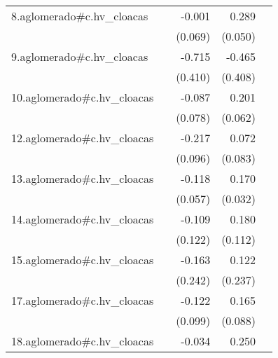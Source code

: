 {\begin{longtable}{l*{4}{D{.}{.}{-1}}}
\addlinespace
8.aglomerado#c.hv\_cloacas&                     &      -0.001         &       0.289\sym{***}&                     \\
            &                     &     (0.069)         &     (0.050)         &                     \\
\addlinespace
9.aglomerado#c.hv\_cloacas&                     &      -0.715         &      -0.465         &                     \\
            &                     &     (0.410)         &     (0.408)         &                     \\
\addlinespace
10.aglomerado#c.hv\_cloacas&                     &      -0.087         &       0.201\sym{**} &                     \\
            &                     &     (0.078)         &     (0.062)         &                     \\
\addlinespace
12.aglomerado#c.hv\_cloacas&                     &      -0.217\sym{*}  &       0.072         &                     \\
            &                     &     (0.096)         &     (0.083)         &                     \\
\addlinespace
13.aglomerado#c.hv\_cloacas&                     &      -0.118\sym{*}  &       0.170\sym{***}&                     \\
            &                     &     (0.057)         &     (0.032)         &                     \\
\addlinespace
14.aglomerado#c.hv\_cloacas&                     &      -0.109         &       0.180         &                     \\
            &                     &     (0.122)         &     (0.112)         &                     \\
\addlinespace
15.aglomerado#c.hv\_cloacas&                     &      -0.163         &       0.122         &                     \\
            &                     &     (0.242)         &     (0.237)         &                     \\
\addlinespace
17.aglomerado#c.hv\_cloacas&                     &      -0.122         &       0.165         &                     \\
            &                     &     (0.099)         &     (0.088)         &                     \\
\addlinespace
18.aglomerado#c.hv\_cloacas&                     &      -0.034         &       0.250\sym{***}&                     \\

\end{longtable}}
